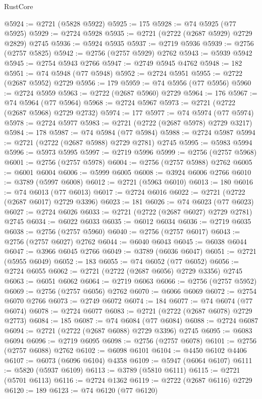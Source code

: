 \begin{lexlean}{RustCore}
\begin{coremodule}
@5924 := @2721 (@5828 @5922)
@5925 := 175
@5928 := @74 @5925 (@77 @5925)
@5929 := @2724 @5928
@5935 := @2721 (@2722 (@2687 @5929) @2729 @2829) @2745
@5936 := @5924 @5935
@5937 := @2719 @5936
@5939 := @2756 (@2757 @5825)
@5942 := @2756 (@2757 @5929) @2762
@5943 := @5939 @5942
@5945 := @2754 @5943 @2766
@5947 := @2749 @5945 @4762
@5948 := 182
@5951 := @74 @5948 (@77 @5948)
@5952 := @2724 @5951
@5955 := @2722 (@2687 @5952) @2729
@5956 := 179
@5959 := @74 @5956 (@77 @5956)
@5960 := @2724 @5959
@5963 := @2722 (@2687 @5960) @2729
@5964 := 176
@5967 := @74 @5964 (@77 @5964)
@5968 := @2724 @5967
@5973 := @2721 (@2722 (@2687 @5968) @2729 @2732)
@5974 := 177
@5977 := @74 @5974 (@77 @5974)
@5978 := @2724 @5977
@5983 := @2721 (@2722 (@2687 @5978) @2729 @3217)
@5984 := 178
@5987 := @74 @5984 (@77 @5984)
@5988 := @2724 @5987
@5994 := @2721 (@2722 (@2687 @5988) @2729 @2781) @2745
@5995 := @5983 @5994
@5996 := @5973 @5995
@5997 := @2719 @5996
@5999 := @2756 (@2757 @5968)
@6001 := @2756 (@2757 @5978)
@6004 := @2756 (@2757 @5988) @2762
@6005 := @6001 @6004
@6006 := @5999 @6005
@6008 := @3924 @6006 @2766
@6010 := @3789 (@5997 @6008)
@6012 := @2721 (@5963 @6010)
@6013 := 180
@6016 := @74 @6013 (@77 @6013)
@6017 := @2724 @6016
@6022 := @2721 (@2722 (@2687 @6017) @2729 @3396)
@6023 := 181
@6026 := @74 @6023 (@77 @6023)
@6027 := @2724 @6026
@6033 := @2721 (@2722 (@2687 @6027) @2729 @2781) @2745
@6034 := @6022 @6033
@6035 := @6012 @6034
@6036 := @2719 @6035
@6038 := @2756 (@2757 @5960)
@6040 := @2756 (@2757 @6017)
@6043 := @2756 (@2757 @6027) @2762
@6044 := @6040 @6043
@6045 := @6038 @6044
@6047 := @3966 @6045 @2766
@6049 := @3789 (@6036 @6047)
@6051 := @2721 (@5955 @6049)
@6052 := 183
@6055 := @74 @6052 (@77 @6052)
@6056 := @2724 @6055
@6062 := @2721 (@2722 (@2687 @6056) @2729 @3356) @2745
@6063 := @6051 @6062
@6064 := @2719 @6063
@6066 := @2756 (@2757 @5952)
@6069 := @2756 (@2757 @6056) @2762
@6070 := @6066 @6069
@6072 := @2754 @6070 @2766
@6073 := @2749 @6072
@6074 := 184
@6077 := @74 @6074 (@77 @6074)
@6078 := @2724 @6077
@6083 := @2721 (@2722 (@2687 @6078) @2729 @2773)
@6084 := 185
@6087 := @74 @6084 (@77 @6084)
@6088 := @2724 @6087
@6094 := @2721 (@2722 (@2687 @6088) @2729 @3396) @2745
@6095 := @6083 @6094
@6096 := @2719 @6095
@6098 := @2756 (@2757 @6078)
@6101 := @2756 (@2757 @6088) @2762
@6102 := @6098 @6101
@6104 := @4450 @6102 @4406
@6107 := @6073 (@6096 @6104) @4358
@6109 := @5947 (@6064 @6107)
@6111 := @5820 (@5937 @6109)
@6113 := @3789 (@5810 @6111)
@6115 := @2721 (@5701 @6113)
@6116 := @2724 @1362
@6119 := @2722 (@2687 @6116) @2729
@6120 := 189
@6123 := @74 @6120 (@77 @6120)

\end{coremodule}
\end{lexlean}
